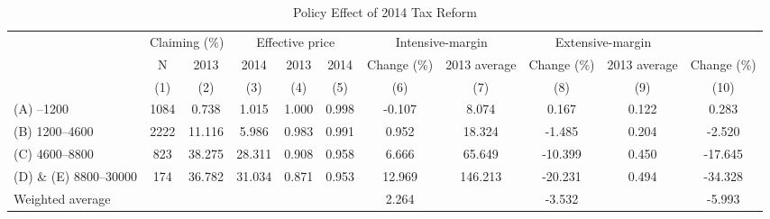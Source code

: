 \begin{table}

\caption{\label{tab:policy-effect}Policy Effect of 2014 Tax Reform}
\centering
\fontsize{7}{9}\selectfont
\begin{threeparttable}
\begin{tabular}[t]{>{\raggedright\arraybackslash}p{10em}cccccccccc}
\toprule
\multicolumn{2}{c}{ } & \multicolumn{2}{c}{Claiming (\%)} & \multicolumn{3}{c}{Effective price} & \multicolumn{2}{c}{Intensive-margin} & \multicolumn{2}{c}{Extensive-margin} \\
\cmidrule(l{3pt}r{3pt}){3-4} \cmidrule(l{3pt}r{3pt}){5-7} \cmidrule(l{3pt}r{3pt}){8-9} \cmidrule(l{3pt}r{3pt}){10-11}
\multicolumn{1}{c}{2013 Income bracket} & \multicolumn{1}{c}{N} & \multicolumn{1}{c}{2013} & \multicolumn{1}{c}{2014} & \multicolumn{1}{c}{2013} & \multicolumn{1}{c}{2014} & \multicolumn{1}{c}{Change (\%)} & \multicolumn{1}{c}{2013 average} & \multicolumn{1}{c}{Change (\%)} & \multicolumn{1}{c}{2013 average} & \multicolumn{1}{c}{Change (\%)} \\
\cmidrule(l{3pt}r{3pt}){1-1} \cmidrule(l{3pt}r{3pt}){2-2} \cmidrule(l{3pt}r{3pt}){3-3} \cmidrule(l{3pt}r{3pt}){4-4} \cmidrule(l{3pt}r{3pt}){5-5} \cmidrule(l{3pt}r{3pt}){6-6} \cmidrule(l{3pt}r{3pt}){7-7} \cmidrule(l{3pt}r{3pt}){8-8} \cmidrule(l{3pt}r{3pt}){9-9} \cmidrule(l{3pt}r{3pt}){10-10} \cmidrule(l{3pt}r{3pt}){11-11}
 & (1) & (2) & (3) & (4) & (5) & (6) & (7) & (8) & (9) & (10)\\
\midrule
(A) --1200 & 1084 & 0.738 & 1.015 & 1.000 & 0.998 & -0.107 & 8.074 & 0.167 & 0.122 & 0.283\\
(B) 1200--4600 & 2222 & 11.116 & 5.986 & 0.983 & 0.991 & 0.952 & 18.324 & -1.485 & 0.204 & -2.520\\
(C) 4600--8800 & 823 & 38.275 & 28.311 & 0.908 & 0.958 & 6.666 & 65.649 & -10.399 & 0.450 & -17.645\\
(D) \& (E) 8800--30000 & 174 & 36.782 & 31.034 & 0.871 & 0.953 & 12.969 & 146.213 & -20.231 & 0.494 & -34.328\\
Weighted average &  &  &  &  &  & 2.264 &  & -3.532 &  & -5.993\\
\bottomrule
\end{tabular}
\begin{tablenotes}

\end{tablenotes}
\end{threeparttable}
\end{table}
